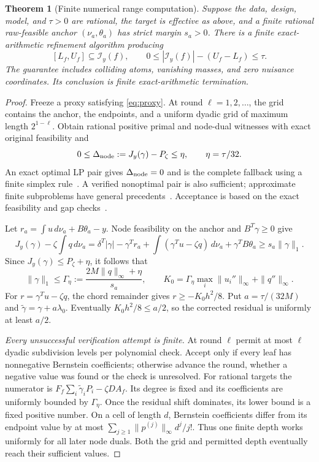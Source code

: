 \documentclass[10pt]{amsart}
\newtheorem{theorem}{Theorem}[section]
\theoremstyle{definition}
\theoremstyle{remark}
\theoremstyle{plain}
\newcommand{\dd}{\,d}
\begin{document}
\begin{theorem}[Finite numerical range computation]\label{thm:numerical}
Suppose the data, design, model, and $\tau>0$ are rational, the target is effective as above, and a finite rational raw-feasible anchor $(\nu_a,\theta_a)$ has strict margin $s_a>0$. There is a finite exact-arithmetic refinement algorithm producing
\begin{equation}\label{eq:range}
 [L_f,U_f]\subseteq\mathcal I_y(f),\qquad
 0\le|\mathcal I_y(f)|-(U_f-L_f)\le\tau.
\end{equation}
The guarantee includes colliding atoms, vanishing masses, and zero nuisance coordinates. Its conclusion is finite exact-arithmetic termination.
\end{theorem}
\begin{proof}
Freeze a proxy satisfying \eqref{eq:proxy}. At round $\ell=1,2,\ldots$, the grid contains the anchor, the endpoints, and a uniform dyadic grid of maximum length $2^{1-\ell}$. Obtain rational positive primal and node-dual witnesses with exact original feasibility and
\begin{equation}\label{eq:nodegap}
 0\le\Delta_{\rm node}:=J_y(\gamma)-P_\zeta\le\eta,
 \qquad \eta=\tau/32.
\end{equation}
An exact optimal LP pair gives $\Delta_{\rm node}=0$ and is the complete fallback using a finite simplex rule~\cite{bland}. A verified nonoptimal pair is also sufficient; approximate finite subproblems have general precedents~\cite{schmid}. Acceptance is based on the exact feasibility and gap checks~\cite{jansson}.

Let $r_a=\int u\dd\nu_a+B\theta_a-y$. Node feasibility on the anchor and $B^T\gamma\ge0$ give
\[
 J_y(\gamma)-\zeta\int q\dd\nu_a
 =\delta^T|\gamma|-\gamma^Tr_a+
 \int(\gamma^Tu-\zeta q)\dd\nu_a+\gamma^TB\theta_a
 \ge s_a\|\gamma\|_1.
\]
Since $J_y(\gamma)\le P_\zeta+\eta$, it follows that
\[
 \|\gamma\|_1\le\Gamma_\eta:=\frac{2M\|q\|_\infty+\eta}{s_a},
 \qquad K_0=\Gamma_\eta\max_i\|u_i''\|_\infty+\|q''\|_\infty.
\]
For $r=\gamma^Tu-\zeta q$, the chord remainder gives $r\ge-K_0h^2/8$. Put $a=\tau/(32M)$ and $\widetilde\gamma=\gamma+a\lambda_0$. Eventually $K_0h^2/8\le a/2$, so the corrected residual is uniformly at least $a/2$.

\emph{Every unsuccessful verification attempt is finite.} At round $\ell$ permit at most $\ell$ dyadic subdivision levels per polynomial check. Accept only if every leaf has nonnegative Bernstein coefficients; otherwise advance the round, whether a negative value was found or the check is unresolved. For rational targets the numerator is $F_f\sum_i\widetilde\gamma_iP_i-\zeta DA_f$. Its degree is fixed and its coefficients are uniformly bounded by $\Gamma_\eta$. Once the residual shift dominates, its lower bound is a fixed positive number. On a cell of length $d$, Bernstein coefficients differ from its endpoint value by at most $\sum_{j\ge1}\|p^{(j)}\|_\infty d^j/j!$. Thus one finite depth works uniformly for all later node duals. Both the grid and permitted depth eventually reach their sufficient values.


\end{proof}
\end{document}

